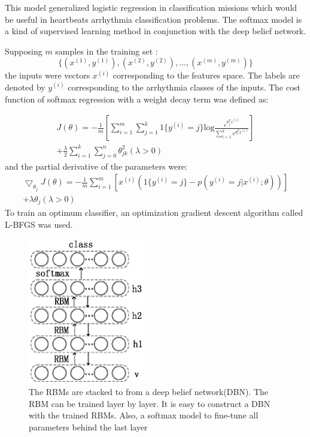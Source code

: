 \documentclass[conference]{IEEEtran}
\begin{document}
This model generalized logistic regression \cite{Peng} in classification missions which would be useful in heartbeats arrhythmia classification problems. The softmax model is a kind of supervised learning method in conjunction with the deep belief network.

Supposing $m$ samples in the training set :
\begin{equation}
\{(x^{(1)},y^{(1)}), (x^{(2)},y^{(2)}), \ldots, (x^{(m)},y^{(m)}) \}
\end{equation}
the inputs were vectors $x^{(i)}$ corresponding to the features space. The labels are denoted by $y^{(i)}$  corresponding to the arrhythmia classes of the inputs.
The cost function of softmax regression with a weight decay term was defined as:

\begin{equation}
\begin{split}
J(\theta) = -\frac{1}{m}[\sum_{i=1}^m\sum_{j=1}^k1\{y^{(i)}=j\}\text{log}{\frac{e^{\theta_j^Tx^{(i)}}}{\sum_{l=1}^ke^{\theta_l^Tx^{(i)}}}}] \\
+ \frac{\lambda}{2} \sum_{i=1}^k \sum_{j=0}^n \theta_{jk}^2 (\lambda>0)
\end{split}
\end{equation}
and the partial derivative of the parameters were:
\begin{equation}
\begin{split}
\bigtriangledown_{\theta_j}J(\theta) = -\frac{1}{m}\sum_{i=1}^m[x^{(i)}(1\{y^{(i)}=j\}-p(y^{(i)}=j|x^{(i)};\theta))] \\
+ \lambda\theta_j  (\lambda>0)
\end{split}
\end{equation}
To train an optimum classifier, an optimization gradient descent algorithm called L-BFGS was used.

\begin{figure}[]
\centering
\includegraphics[width=2in]{dbn.eps}
\caption{The RBMs are stacked to from a deep belief network(DBN). The RBM can be trained layer by layer. It is easy to construct a DBN with the trained RBMs. Also, a softmax model to fine-tune all parameters behind the last layer}
\label{figure2}
\end{figure} 
\end{document}
